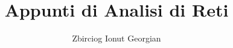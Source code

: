 \documentclass[a4paper,12pt]{report}
\begin{document}
\title{Appunti di Analisi di Reti}
\author{Zbirciog Ionut Georgian}
\maketitle
 
\setcounter{tocdepth}{3}
\setcounter{secnumdepth}{3}
\tableofcontents







\end{document}
